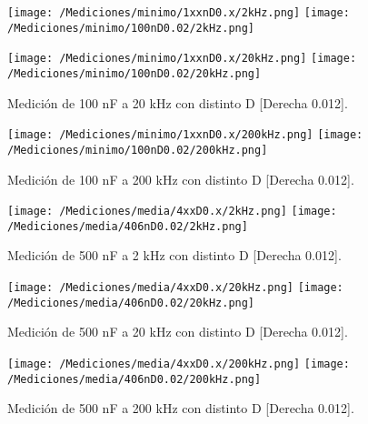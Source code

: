 \begin{figure}[H]
	\centering
	\texttt{[image: /Mediciones/minimo/1xxnD0.x/2kHz.png]}
	\texttt{[image: /Mediciones/minimo/100nD0.02/2kHz.png]}
	\label{fig:fcon1}
\end{figure}
\begin{figure}[H]
	\centering
	\texttt{[image: /Mediciones/minimo/1xxnD0.x/20kHz.png]}
	\texttt{[image: /Mediciones/minimo/100nD0.02/20kHz.png]}
\caption{Medición de 100 nF a 20 kHz con distinto D [Derecha 0.012].}
	\label{fig:fcon2}
\end{figure}
\begin{figure}[H]
	\centering
	\texttt{[image: /Mediciones/minimo/1xxnD0.x/200kHz.png]}
	\texttt{[image: /Mediciones/minimo/100nD0.02/200kHz.png]}
\caption{Medición de 100 nF a 200 kHz con distinto D [Derecha 0.012].}
	\label{fig:fcon3}
\end{figure}
\begin{figure}[H]
	\centering
	\texttt{[image: /Mediciones/media/4xxD0.x/2kHz.png]}
	\texttt{[image: /Mediciones/media/406nD0.02/2kHz.png]}
\caption{Medición de 500 nF a 2 kHz con distinto D [Derecha 0.012].}
	\label{fig:fcon4}
\end{figure}
\begin{figure}[H]
	\centering
	\texttt{[image: /Mediciones/media/4xxD0.x/20kHz.png]}
	\texttt{[image: /Mediciones/media/406nD0.02/20kHz.png]}
\caption{Medición de 500 nF a 20 kHz con distinto D [Derecha 0.012].}
	\label{fig:fcon5}
\end{figure}
\begin{figure}[H]
	\centering
	\texttt{[image: /Mediciones/media/4xxD0.x/200kHz.png]}
	\texttt{[image: /Mediciones/media/406nD0.02/200kHz.png]}
\caption{Medición de 500 nF a 200 kHz con distinto D [Derecha 0.012].}
	\label{fig:fcon6}
\end{figure}
